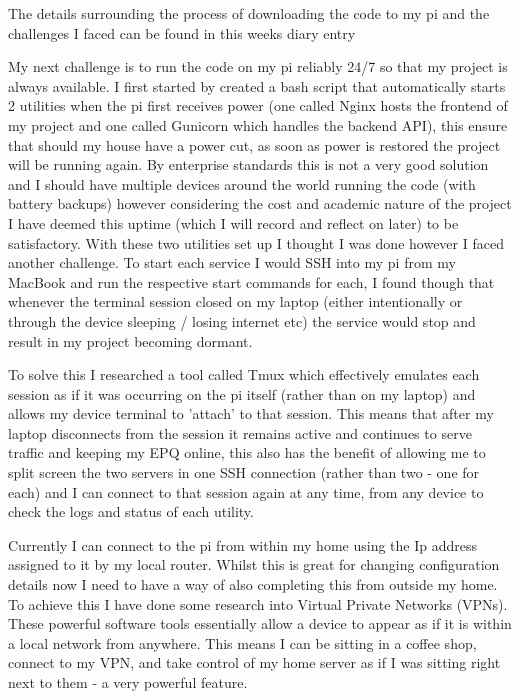 The details surrounding the process of downloading the code to my pi and the challenges I faced can be found in this weeks diary entry

My next challenge is to run the code on my pi reliably 24/7 so that my project is always available. I first started by created a bash script that automatically starts 2 utilities when the pi first receives power (one called Nginx hosts the frontend of my project and one called Gunicorn which handles the backend API), this ensure that should my house have a power cut, as soon as power is restored the project will be running again. By enterprise standards this is not a very good solution and I should have multiple devices around the world running the code (with battery backups) however considering the cost and academic nature of the project I have deemed this uptime (which I will record and reflect on later) to be satisfactory. With these two utilities set up I thought I was done however I faced another challenge. To start each service I would SSH into my pi from my MacBook and run the respective start commands for each, I found though that whenever the terminal session closed on my laptop (either intentionally or through the device sleeping / losing internet etc) the service would stop and result in my project becoming dormant.

To solve this I researched a tool called Tmux which effectively emulates each session as if it was occurring on the pi itself (rather than on my laptop) and allows my device terminal to 'attach' to that session. This means that after my laptop disconnects from the session it remains active and continues to serve traffic and keeping my EPQ online, this also has the benefit of allowing me to split screen the two servers in one SSH connection (rather than two - one for each) and I can connect to that session again at any time, from any device to check the logs and status of each utility.


Currently I can connect to the pi from within my home using the Ip address assigned to it by my local router. Whilst this is great for changing configuration details now I need to have a way of also completing this from outside my home. To achieve this I have done some research into Virtual Private Networks (VPNs). These powerful software tools essentially allow a device to appear as if it is within a local network from anywhere. This means I can be sitting in a coffee shop, connect to my VPN, and take control of my home server as if I was sitting right next to them - a very powerful feature.

